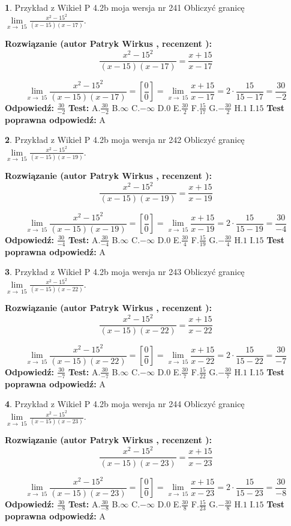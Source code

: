 \documentclass[12pt, a4paper]{article}
\theoremstyle{definition} %
\newtheorem{zad}{}
\newcommand{\zadStart}[1]{\begin{zad}#1\newline}
\newcommand{\zadStop}{\end{zad}}
\newcommand{\rozwStart}[2]{\noindent \textbf{Rozwiązanie (autor #1 , recenzent #2): }\newline}
\newcommand{\rozwStop}{\newline}
\newcommand{\odpStart}{\noindent \textbf{Odpowiedź:}\newline}
\newcommand{\odpStop}{\newline}
\newcommand{\testStart}{\noindent \textbf{Test:}\newline}
\newcommand{\testStop}{\newline}
\newcommand{\kluczStart}{\noindent \textbf{Test poprawna odpowiedź:}\newline}
\newcommand{\kluczStop}{\newline}
\begin{document}
\zadStart{Przykład z Wikieł P 4.2b moja wersja nr 241}
Obliczyć granicę $\lim\limits_{x\to\ 15}\frac{x^{2}-15^{2}}{(x-15)(x-17)}$.
\zadStop
\rozwStart{Patryk Wirkus}{}
$$\frac{x^{2}-15^{2}}{(x-15)(x-17)}=\frac{x+15}{x-17}$$

$$\lim\limits_{x\to\ 15}\frac{x^{2}-15^{2}}{(x-15)(x-17)}=[\frac{0}{0}]=\lim\limits_{x\to\ 15}\frac{x+15}{x-17}=2 \cdot \frac{15}{15-17} = \frac{30}{-2}$$
\rozwStop
\odpStart
$\frac{30}{-2}$
\odpStop
\testStart
A.$\frac{30}{-2}$
B.$\infty$
C.$-\infty$
D.$0$
E.$\frac{30}{2}$
F.$\frac{15}{17}$
G.$-\frac{30}{2}$
H.$1$
I.$15$
\testStop
\kluczStart
A
\kluczStop



\zadStart{Przykład z Wikieł P 4.2b moja wersja nr 242}
Obliczyć granicę $\lim\limits_{x\to\ 15}\frac{x^{2}-15^{2}}{(x-15)(x-19)}$.
\zadStop
\rozwStart{Patryk Wirkus}{}
$$\frac{x^{2}-15^{2}}{(x-15)(x-19)}=\frac{x+15}{x-19}$$

$$\lim\limits_{x\to\ 15}\frac{x^{2}-15^{2}}{(x-15)(x-19)}=[\frac{0}{0}]=\lim\limits_{x\to\ 15}\frac{x+15}{x-19}=2 \cdot \frac{15}{15-19} = \frac{30}{-4}$$
\rozwStop
\odpStart
$\frac{30}{-4}$
\odpStop
\testStart
A.$\frac{30}{-4}$
B.$\infty$
C.$-\infty$
D.$0$
E.$\frac{30}{4}$
F.$\frac{15}{19}$
G.$-\frac{30}{4}$
H.$1$
I.$15$
\testStop
\kluczStart
A
\kluczStop



\zadStart{Przykład z Wikieł P 4.2b moja wersja nr 243}
Obliczyć granicę $\lim\limits_{x\to\ 15}\frac{x^{2}-15^{2}}{(x-15)(x-22)}$.
\zadStop
\rozwStart{Patryk Wirkus}{}
$$\frac{x^{2}-15^{2}}{(x-15)(x-22)}=\frac{x+15}{x-22}$$

$$\lim\limits_{x\to\ 15}\frac{x^{2}-15^{2}}{(x-15)(x-22)}=[\frac{0}{0}]=\lim\limits_{x\to\ 15}\frac{x+15}{x-22}=2 \cdot \frac{15}{15-22} = \frac{30}{-7}$$
\rozwStop
\odpStart
$\frac{30}{-7}$
\odpStop
\testStart
A.$\frac{30}{-7}$
B.$\infty$
C.$-\infty$
D.$0$
E.$\frac{30}{7}$
F.$\frac{15}{22}$
G.$-\frac{30}{7}$
H.$1$
I.$15$
\testStop
\kluczStart
A
\kluczStop



\zadStart{Przykład z Wikieł P 4.2b moja wersja nr 244}
Obliczyć granicę $\lim\limits_{x\to\ 15}\frac{x^{2}-15^{2}}{(x-15)(x-23)}$.
\zadStop
\rozwStart{Patryk Wirkus}{}
$$\frac{x^{2}-15^{2}}{(x-15)(x-23)}=\frac{x+15}{x-23}$$

$$\lim\limits_{x\to\ 15}\frac{x^{2}-15^{2}}{(x-15)(x-23)}=[\frac{0}{0}]=\lim\limits_{x\to\ 15}\frac{x+15}{x-23}=2 \cdot \frac{15}{15-23} = \frac{30}{-8}$$
\rozwStop
\odpStart
$\frac{30}{-8}$
\odpStop
\testStart
A.$\frac{30}{-8}$
B.$\infty$
C.$-\infty$
D.$0$
E.$\frac{30}{8}$
F.$\frac{15}{23}$
G.$-\frac{30}{8}$
H.$1$
I.$15$
\testStop
\kluczStart
A
\kluczStop
\end{document}
